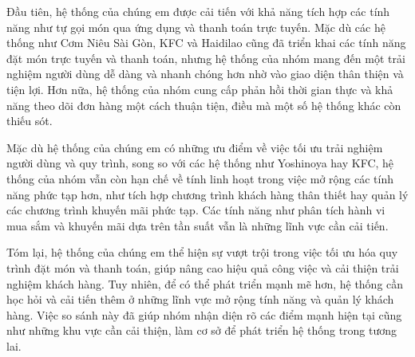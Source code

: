 Đầu tiên, hệ thống của chúng em được cải tiến với khả năng tích hợp các tính năng như tự gọi món qua ứng dụng và thanh toán trực tuyến. Mặc dù các hệ thống như Cơm Niêu Sài Gòn, KFC và Haidilao cũng đã triển khai các tính năng đặt món trực tuyến và thanh toán, nhưng hệ thống của nhóm mang đến một trải nghiệm người dùng dễ dàng và nhanh chóng hơn nhờ vào giao diện thân thiện và tiện lợi. Hơn nữa, hệ thống của nhóm cung cấp phản hồi thời gian thực và khả năng theo dõi đơn hàng một cách thuận tiện, điều mà một số hệ thống khác còn thiếu sót.

Mặc dù hệ thống của chúng em có những ưu điểm về việc tối ưu trải nghiệm người dùng và quy trình, song so với các hệ thống như Yoshinoya hay KFC, hệ thống của nhóm vẫn còn hạn chế về tính linh hoạt trong việc mở rộng các tính năng phức tạp hơn, như tích hợp chương trình khách hàng thân thiết hay quản lý các chương trình khuyến mãi phức tạp. Các tính năng như phân tích hành vi mua sắm và khuyến mãi dựa trên tần suất vẫn là những lĩnh vực cần cải tiến.

Tóm lại, hệ thống của chúng em thể hiện sự vượt trội trong việc tối ưu hóa quy trình đặt món và thanh toán, giúp nâng cao hiệu quả công việc và cải thiện trải nghiệm khách hàng. Tuy nhiên, để có thể phát triển mạnh mẽ hơn, hệ thống cần học hỏi và cải tiến thêm ở những lĩnh vực mở rộng tính năng và quản lý khách hàng. Việc so sánh này đã giúp nhóm nhận diện rõ các điểm mạnh hiện tại cũng như những khu vực cần cải thiện, làm cơ sở để phát triển hệ thống trong tương lai.




